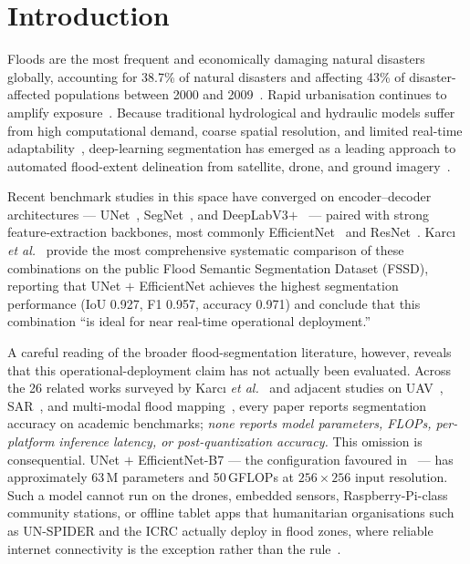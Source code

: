 
\section{Introduction}
\label{sec:intro}

Floods are the most frequent and economically damaging natural disasters globally, accounting for 38.7\% of natural disasters and affecting 43\% of disaster-affected populations between 2000 and 2009~\cite{du2010health}. Rapid urbanisation continues to amplify exposure~\cite{hemmati2020urban}. Because traditional hydrological and hydraulic models suffer from high computational demand, coarse spatial resolution, and limited real-time adaptability~\cite{kumar2023flood}, deep-learning segmentation has emerged as a leading approach to automated flood-extent delineation from satellite, drone, and ground imagery~\cite{bentivoglio2022deep}.

Recent benchmark studies in this space have converged on encoder--decoder architectures --- UNet~\cite{ronneberger2015unet}, SegNet~\cite{badrinarayanan2017segnet}, and DeepLabV3$+$~\cite{chen2018encoder} --- paired with strong feature-extraction backbones, most commonly EfficientNet~\cite{tan2019efficientnet} and ResNet~\cite{he2016deep}. Karc{\i} \emph{et al.}~\cite{karci2026deep} provide the most comprehensive systematic comparison of these combinations on the public Flood Semantic Segmentation Dataset (FSSD), reporting that UNet $+$ EfficientNet achieves the highest segmentation performance (IoU 0.927, F1 0.957, accuracy 0.971) and conclude that this combination ``is ideal for near real-time operational deployment.''

A careful reading of the broader flood-segmentation literature, however, reveals that this operational-deployment claim has not actually been evaluated. Across the 26 related works surveyed by Karc{\i} \emph{et al.}~\cite{karci2026deep} and adjacent studies on UAV~\cite{hernandez2022flood}, SAR~\cite{pechmay2023flooded}, and multi-modal flood mapping~\cite{chamatidis2024vision}, every paper reports segmentation accuracy on academic benchmarks; \emph{none reports model parameters, FLOPs, per-platform inference latency, or post-quantization accuracy.} This omission is consequential. UNet $+$ EfficientNet-B7 --- the configuration favoured in~\cite{karci2026deep} --- has approximately 63\,M parameters and 50\,GFLOPs at $256{\times}256$ input resolution. Such a model cannot run on the drones, embedded sensors, Raspberry-Pi-class community stations, or offline tablet apps that humanitarian organisations such as UN-SPIDER and the ICRC actually deploy in flood zones, where reliable internet connectivity is the exception rather than the rule~\cite{munawar2021review}.

